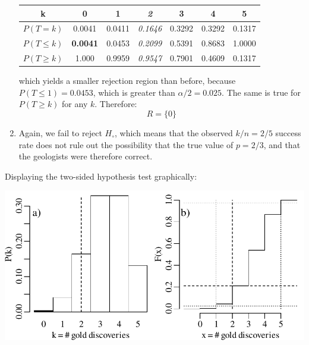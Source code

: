 \begin{enumerate}
  \begin{center}
    \begin{tabular}{ccccccc}
      k & \textbf{0} & 1 & \textit{2} & 3 & 4 & 5 \\ \hline
      $P(T=k)$ & 0.0041 & 0.0411 & \textit{0.1646} & 0.3292 & 0.3292 & 0.1317 \\
      $P({T}\leq{k})$ & \textbf{0.0041} & 0.0453 &
      \textit{0.2099} & 0.5391 & 0.8683 & 1.0000 \\
      $P({T}\geq{k})$ & 1.000 & 0.9959 & \textit{0.9547} & 0.7901 & 0.4609 & 0.1317
    \end{tabular}
  \end{center}

  \noindent which yields a smaller rejection region than before,
  because $P(T\leq{1})=0.0453$, which is greater than
  $\alpha/2=0.025$.  The same is true for $P(T\geq{k})$ for any
  $k$. Therefore:
  \[
  R = \{0\}
  \]

\item Again, we fail to reject $H_\circ$, which means that the
  observed $k/n=2/5$ success rate does not rule out the possibility
  that the true value of $p=2/3$, and that the geologists were
  therefore correct.
  
\end{enumerate}

Displaying the two-sided hypothesis test graphically:\medskip

\noindent\begin{minipage}[t][][b]{.6\textwidth}
\includegraphics[width=\textwidth]{../figures/2sidedbinomialrejection5.pdf}
\medskip
\end{minipage}
\begin{minipage}[t][][t]{.4\textwidth}
  \label{fig:2sidedbinomialrejection5}
\end{minipage}

